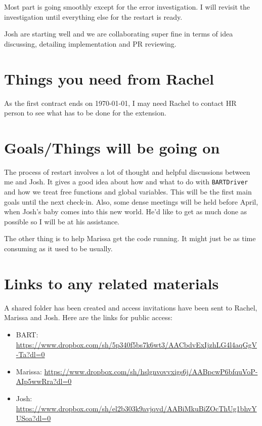 \documentclass{article}
\begin{document}
Most part is going smoothly except for the error investigation. I will revisit the investigation until everything else for the restart is ready.

Josh are starting well and we are collaborating super fine in terms of idea discussing, detailing implementation and PR reviewing.

\section{Things you need from Rachel}
As the first contract ends on \today, I may need Rachel to contact HR person to see what 
has to be done for the extension.

\section{Goals/Things will be going on}
The process of restart involves a lot of thought and helpful discussions between me and Josh.
It gives a good idea about how and what to do with {\tt BARTDriver} and how we treat free functions and global variables. This will be the first main goals until the next check-in. Also, some dense meetings will be held before April, when Josh's baby comes into this new world. He'd like to get as much done as possible so I will be at his assistance.

The other thing is to help Marissa get the code running. It might just be as time consuming as it used to be usually.

\section{Links to any related materials}
A shared folder has been created and access invitations have been sent to Rachel, Marissa and 
Josh. Here are the links for public access:
\begin{itemize}
	\item BART: \url{https://www.dropbox.com/sh/5p340f5bs7k6wt3/AACbdvExIjzhLG4l4aqGgV-Ta?dl=0}
	\item Marissa: \url{https://www.dropbox.com/sh/hslgnvovvxigs6j/AABpcwP6bfquVoP-AIp5wwRra?dl=0}
	\item Josh: \url{https://www.dropbox.com/sh/el2b303k9avjqvd/AABiMkuBiZOcThUg1bhvYUSoa?dl=0}
\end{itemize}
\end{document}
